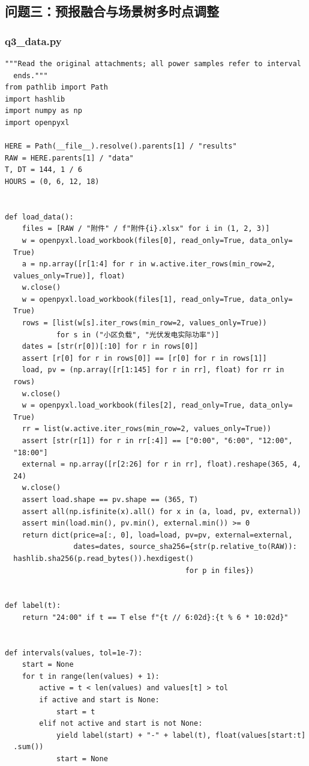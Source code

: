 \subsection{问题三：预报融合与场景树多时点调整}

\subsubsection*{q3\_data.py}
\begin{verbatim}
"""Read the original attachments; all power samples refer to interval
  ends."""
from pathlib import Path
import hashlib
import numpy as np
import openpyxl

HERE = Path(__file__).resolve().parents[1] / "results"
RAW = HERE.parents[1] / "data"
T, DT = 144, 1 / 6
HOURS = (0, 6, 12, 18)


def load_data():
    files = [RAW / "附件" / f"附件{i}.xlsx" for i in (1, 2, 3)]
    w = openpyxl.load_workbook(files[0], read_only=True, data_only=
  True)
    a = np.array([r[1:4] for r in w.active.iter_rows(min_row=2,
  values_only=True)], float)
    w.close()
    w = openpyxl.load_workbook(files[1], read_only=True, data_only=
  True)
    rows = [list(w[s].iter_rows(min_row=2, values_only=True))
            for s in ("小区负载", "光伏发电实际功率")]
    dates = [str(r[0])[:10] for r in rows[0]]
    assert [r[0] for r in rows[0]] == [r[0] for r in rows[1]]
    load, pv = (np.array([r[1:145] for r in rr], float) for rr in
  rows)
    w.close()
    w = openpyxl.load_workbook(files[2], read_only=True, data_only=
  True)
    rr = list(w.active.iter_rows(min_row=2, values_only=True))
    assert [str(r[1]) for r in rr[:4]] == ["0:00", "6:00", "12:00",
  "18:00"]
    external = np.array([r[2:26] for r in rr], float).reshape(365, 4,
  24)
    w.close()
    assert load.shape == pv.shape == (365, T)
    assert all(np.isfinite(x).all() for x in (a, load, pv, external))
    assert min(load.min(), pv.min(), external.min()) >= 0
    return dict(price=a[:, 0], load=load, pv=pv, external=external,
                dates=dates, source_sha256={str(p.relative_to(RAW)):
  hashlib.sha256(p.read_bytes()).hexdigest()
                                          for p in files})


def label(t):
    return "24:00" if t == T else f"{t // 6:02d}:{t % 6 * 10:02d}"


def intervals(values, tol=1e-7):
    start = None
    for t in range(len(values) + 1):
        active = t < len(values) and values[t] > tol
        if active and start is None:
            start = t
        elif not active and start is not None:
            yield label(start) + "-" + label(t), float(values[start:t]
  .sum())
            start = None
\end{verbatim}


